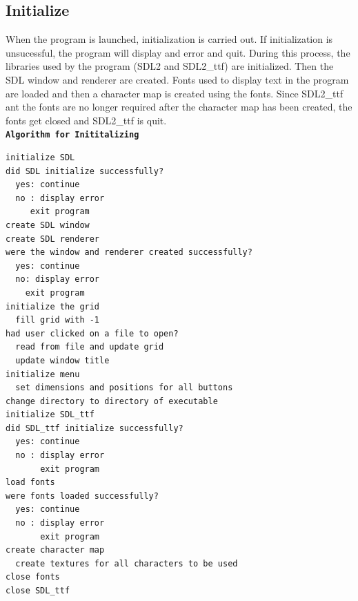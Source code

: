 \documentclass[report]{subfiles}
\begin{document}
    \subsection{Initialize}
    When the program is launched, initialization is carried out. If initialization is unsucessful, the program will display and error and quit. During this process, the libraries used by the program (SDL2 and SDL2\_ttf) are initialized. Then the SDL window and renderer are created. Fonts used to display text in the program are loaded and then a character map is created using the fonts. Since SDL2\_ttf ant the fonts are no longer required after the character map has been created, the fonts get closed and SDL2\_ttf is quit.\\
        \textbf{\texttt{Algorithm for Inititalizing}}
        \begin{verbatim}
initialize SDL
did SDL initialize successfully?
  yes: continue
  no : display error
     exit program
create SDL window
create SDL renderer
were the window and renderer created successfully?
  yes: continue
  no: display error
    exit program
initialize the grid
  fill grid with -1
had user clicked on a file to open?
  read from file and update grid
  update window title
initialize menu
  set dimensions and positions for all buttons
change directory to directory of executable 
initialize SDL_ttf
did SDL_ttf initialize successfully?
  yes: continue
  no : display error
       exit program
load fonts
were fonts loaded successfully?
  yes: continue
  no : display error
       exit program
create character map
  create textures for all characters to be used
close fonts
close SDL_ttf
        \end{verbatim}
\end{document}
